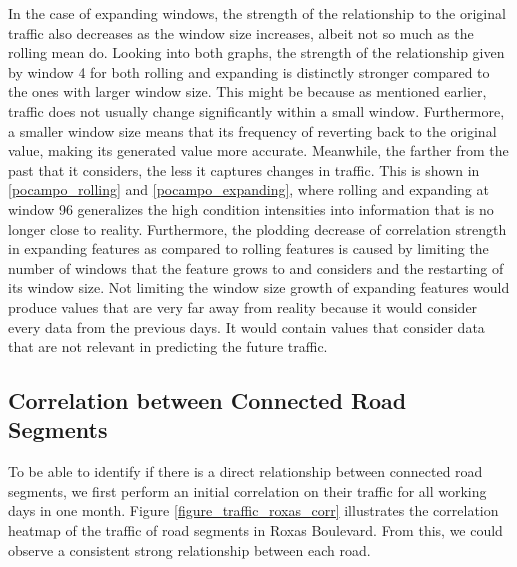In the case of expanding windows, the strength of the relationship to the original traffic also decreases as the window size increases, albeit not so much as the rolling mean do. Looking into both graphs, the strength of the relationship given by window 4 for both rolling and expanding is distinctly stronger compared to the ones with larger window size. This might be because as mentioned earlier, traffic does not usually change significantly within a small window. Furthermore, a smaller window size means that its frequency of reverting back to the original value, making its generated value more accurate. Meanwhile, the farther from the past that it considers, the less it captures changes in traffic. This is shown in \ref{pocampo_rolling} and \ref{pocampo_expanding}, where rolling and expanding at window 96 generalizes the high condition intensities into information that is no longer close to reality. Furthermore, the plodding decrease of correlation strength in expanding features as compared to rolling features is caused by limiting the number of windows that the feature grows to and considers and the restarting of its window size. Not limiting the window size growth of expanding features would produce values that are very far away from reality because it would consider every data from the previous days. It would contain values that consider data that are not relevant in predicting the future traffic.




\subsection{Correlation between Connected Road Segments}
To be able to identify if there is a direct relationship between connected road segments, we first perform an initial correlation on their traffic for all working days in one month. Figure \ref{figure_traffic_roxas_corr} illustrates the correlation heatmap of the traffic of road segments in Roxas Boulevard. From this, we could observe a consistent strong relationship between each road. 



